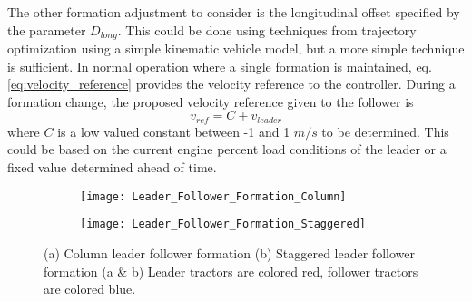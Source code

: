 The other formation adjustment to consider is the longitudinal offset specified by the parameter $D_{long}$. This could be done using techniques from trajectory optimization using a simple kinematic vehicle model, but a more simple technique is sufficient. In normal operation where a single formation is maintained, eq. \ref{eq:velocity_reference} provides the velocity reference to the controller. During a formation change, the proposed velocity reference given to the follower is
\begin{equation}
    v_{ref} = C + v_{leader}
\end{equation}
where $C$ is a low valued constant between -1 and 1 $m/s$ to be determined. This could be based on the current engine percent load conditions of the leader or a fixed value determined ahead of time.
\begin{figure}[hb]
\begin{subfigure}{1\textwidth}
\centering
\texttt{[image: Leader\_Follower\_Formation\_Column]}
\caption{}
\label{fig:Leader_Follower_Formation_Column}
\end{subfigure}
\begin{subfigure}{1\textwidth}
\centering
\texttt{[image: Leader\_Follower\_Formation\_Staggered]}
\caption{}
\label{fig:Leader_Follower_Formation_Staggered}
\end{subfigure}
\caption{(a) Column leader follower formation  (b) Staggered leader follower formation  (a \& b) Leader tractors are colored red, follower tractors are colored blue.}
\label{fig:Leader_Follower_Concept}
\end{figure}